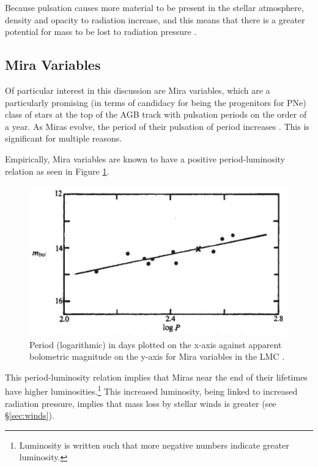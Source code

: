 \documentclass[twocolumn]{aastex63}
\begin{document}
Because pulsation causes more material to be present in the stellar atmosphere, density and opacity to radiation increase, and this means that there is a greater potential for mass to be lost to radiation pressure \citep{liljegren}. 

\subsection{Mira Variables} \label{subsec:mira}

Of particular interest in this discussion are Mira variables, which are a particularly promising (in terms of candidacy for being the progenitors for PNe) class of stars at the top of the AGB track with pulsation periods on the order of a year. As Miras evolve, the period of their pulsation of period increases \citep{fadeyev}. This is significant for multiple reasons. 

Empirically, Mira variables are known to have a positive period-luminosity relation \citep{robertson, glass} as seen in Figure \ref{fig:period_luminosity}.

\begin{figure}[!ht]
    \includegraphics[width=\textwidth]{period_luminosity.png}
    \caption{Period (logarithmic) in days plotted on the x-axis against apparent bolometric magnitude on the y-axis for Mira variables in the LMC \citep{glass}.}
    \label{fig:period_luminosity}
\end{figure}


This period-luminosity relation implies that Miras near the end of their lifetimes have higher luminosities.\footnote{Luminosity is written such that more negative numbers indicate greater luminosity.} This increased luminosity, being linked to increased radiation pressure, implies that mass loss by stellar winds is greater (see \S \ref{sec:winds}). 
\end{document}
